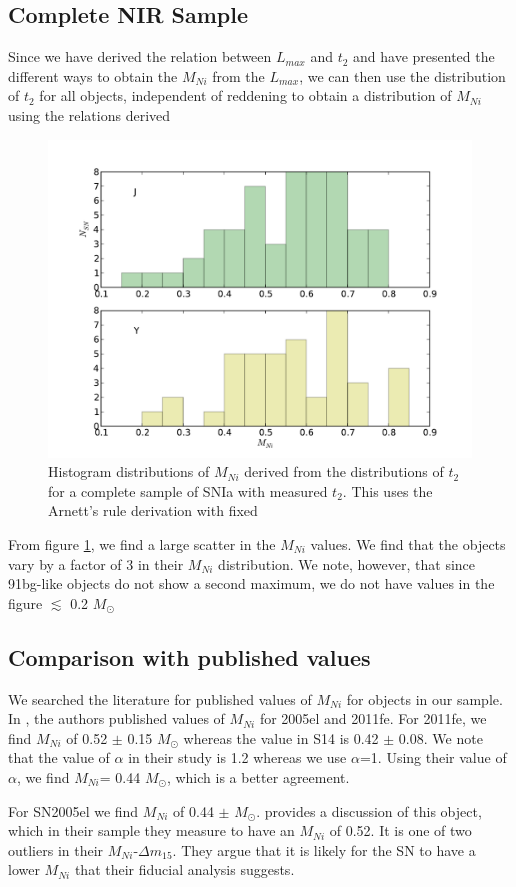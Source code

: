 \subsection{Complete NIR Sample}
Since we have derived the relation between $L_{max}$ and $t_2$ and have presented the different ways to obtain the $M_{Ni}$ from the $L_{max}$, we can then use the distribution of $t_2$ for all objects, independent of reddening to obtain a distribution of $M_{Ni}$ using the relations derived

\begin{figure}
\includegraphics[width=.5\textwidth, trim= 0 30 0 30]{../plot_rel/nihist_rel.pdf}
\caption{Histogram distributions of $M_{Ni}$ derived from the distributions of $t_2$ for a complete sample of SNIa with measured $t_2$. This uses the Arnett's rule derivation with fixed }
\label{fig:hist}
\end{figure}

From figure \ref{fig:hist}, we find a large scatter in the $M_{Ni}$ values. We find that the objects vary by a factor of 3 in their $M_{Ni}$ distribution. We note, however, that since 91bg-like objects do not show a second maximum, we do not have values in the figure $\lesssim$ 0.2 $M_{\odot}$

\subsection{Comparison with published values}
We searched the literature for published values of $M_{Ni}$ for objects in our sample. In \citet{Scalzo2014} , the authors published values of $M_{Ni}$ for 2005el and 2011fe. For 2011fe, we find $M_{Ni}$ of 0.52 $\pm$ 0.15 $M_{\odot}$ whereas the value in S14 is 0.42 $\pm$ 0.08. We note that the value of $\alpha$ in their study is 1.2 whereas we use $\alpha$=1. Using their value of $\alpha$, we find $M_{Ni}$= 0.44 $M_{\odot}$, which is a better agreement. 

For SN2005el we find $M_{Ni}$ of 0.44 $\pm$ $M_{\odot}$. \citet{Scalzo2014} provides a discussion of this object, which in their sample they measure to have an $M_{Ni}$ of 0.52. It is one of two outliers in their $M_{Ni}$-$\Delta m_{15}$. They argue that it is likely for the SN to have a lower $M_{Ni}$ that their fiducial analysis suggests.  





